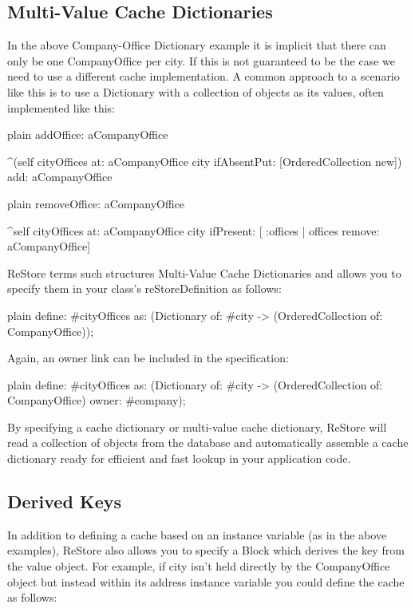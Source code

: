 \documentclass[10pt,twoside,english]{_support/latex/sbabook/sbabook}
\begin{document}
\subsection{Multi-Value Cache Dictionaries}
In the above Company-Office Dictionary example it is implicit that there can only be one CompanyOffice per city. If this is not guaranteed to be the case we need to use a different cache implementation. A common approach to a scenario like this is to use a Dictionary with a collection of objects as its values, often implemented like this:

\begin{displaycode}{plain}
addOffice: aCompanyOffice

	^(self cityOffices at: aCompanyOffice city ifAbsentPut: [OrderedCollection new]) add: aCompanyOffice
\end{displaycode}

\begin{displaycode}{plain}
removeOffice: aCompanyOffice

	^self cityOffices at: aCompanyOffice city ifPresent: [ :offices | offices remove: aCompanyOffice]
\end{displaycode}

ReStore terms such structures Multi-Value Cache Dictionaries and allows you to specify them in your class’s reStoreDefinition as follows:

\begin{displaycode}{plain}
define: #cityOffices as: (Dictionary of: #city -> (OrderedCollection of: CompanyOffice));
\end{displaycode}

Again, an owner link can be included in the specification: 

\begin{displaycode}{plain}
define: #cityOffices as: (Dictionary of: #city -> (OrderedCollection of: CompanyOffice) owner: #company);
\end{displaycode}

By specifying a cache dictionary or multi-value cache dictionary, ReStore will read a collection of objects from the database and automatically assemble a cache dictionary ready for efficient and fast lookup in your application code. 
\subsection{Derived Keys}
In addition to defining a cache based on an instance variable (as in the above examples), ReStore also allows you to specify a Block which derives the key from the value object. For example, if city isn’t held directly by the CompanyOffice object but instead within its address instance variable you could define the cache as follows: 
\end{document}

